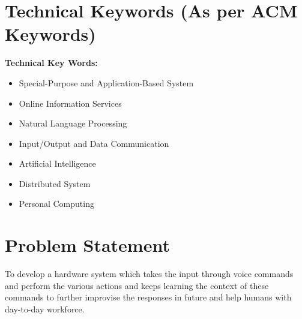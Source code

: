 \documentclass[16pt,oneside,a4paper]{article}
\begin{document}
\section{Technical Keywords (As per ACM Keywords)}
 {\bfseries Technical Key Words:}      
 \begin{itemize}
 \item 	Special-Purpose and Application-Based System
 \item	Online Information Services
 \item  Natural Language Processing
 \item  Input/Output and Data Communication
 \item  Artificial Intelligence
 \item  Distributed System
 \item  Personal Computing
 \end{itemize}
%	  
%
%	



\section{Problem Statement}
\label{sec:problem}
To develop a hardware system which takes the input through voice commands and perform the various actions and keeps learning the context of these commands to further improvise the responses in future and help humans with day-to-day workforce.
\end{document}
